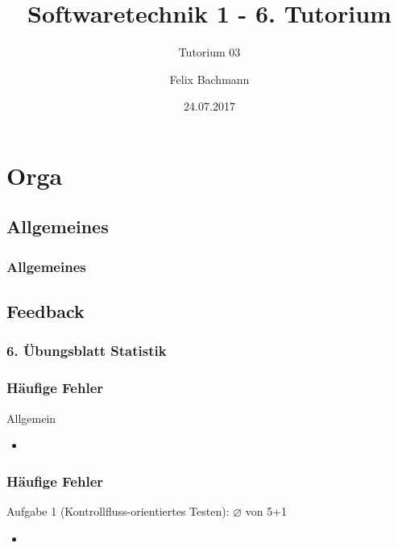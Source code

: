 \documentclass[18pt]{beamer}
\title[SWT1]{Softwaretechnik 1 - 6. Tutorium}
\subtitle{Tutorium 03}
\author{Felix Bachmann}
\date{24.07.2017}
\institute{KIT - Institut für Programmstrukturen und Datenorganisation (IPD)}
\begin{document}
	
\setcounter{tocdepth}{2}
	
\begin{frame}
\titlepage
\end{frame}

\begin{frame}
\tableofcontents
\end{frame}


\section{Orga}
	\subsection{Allgemeines}
	\begin{frame}
		\frametitle{Allgemeines}
	\end{frame}

	\subsection{Feedback}
	\begin{frame}
		\frametitle{6. Übungsblatt Statistik}
	\end{frame}

	\begin{frame}
		\frametitle{Häufige Fehler}
		\begin{block}{Allgemein}
			\begin{itemize}
				\item %
			\end{itemize}
		\end{block}
	\end{frame}

	\begin{frame}
		\frametitle{Häufige Fehler}
		\begin{block}{Aufgabe 1 (Kontrollfluss-orientiertes Testen): $\diameter$ von 5+1} %
			\begin{itemize}
				\pause 
				\item %
			\end{itemize}
		\end{block}
	\end{frame}
\end{document}
